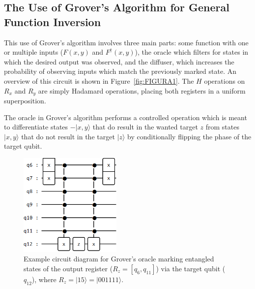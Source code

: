 \documentclass[twocolumn]{cinc}
\begin{document}
  \subsection{The Use of Grover's Algorithm for General Function Inversion} 

  
  This use of Grover's algorithm involves three main parts: some function with
  one or multiple inputs ($F(x,y)$ and $F^{\dagger}(x,y)$), the oracle which filters for states in which the
  desired output was observed, and the diffuser, which increases the probability 
  of observing inputs which match the previously marked state. An overview of this circuit is
  shown in Figure~\ref{fig:FIGURA1}. The $H$ operations on $R_x$ and $R_y$ are
  simply Hadamard operations, placing both registers in a uniform superposition.

  The oracle in Grover's algorithm performs a controlled operation which is meant
  to differentiate states $-|x,y\rangle$ that do result in the wanted target $z$ from 
  states $|x,y\rangle$ that do not result in the target $|z\rangle$ by conditionally 
  flipping the phase of the target qubit.
  
  \begin{figure}[!ht]
  \centering
  \includegraphics[width=5.0cm]{oracle_15.png}
  \caption{Example circuit diagram for Grover's oracle marking entangled states 
  of the output register ($R_z=[q_6,q_{11}]$) via the target qubit ($q_{12}$), where
  $R_z=|15\rangle = |001111\rangle$.}\label{fig:FIGURA2}
  \end{figure}
\end{document}

